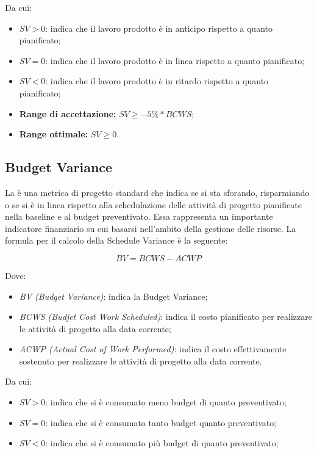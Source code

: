 \documentclass[openany,12pt,a4paper]{report}
\begin{document}
Da cui:

\begin{itemize}
    \item \textit{$SV > 0$}: indica che il lavoro prodotto è in anticipo rispetto a quanto pianificato;
    \item \textit{$SV = 0$}: indica che il lavoro prodotto è in linea rispetto a quanto pianificato;
    \item \textit{$SV < 0$}: indica che il lavoro prodotto è in ritardo rispetto a quanto pianificato;
\end{itemize}

\begin{itemize}
    \item \textbf{Range di accettazione:} $ SV \geq -5\%*BCWS $;
    
    \item \textbf{Range ottimale:} $ SV \geq 0 $.
\end{itemize}

\subsection{Budget Variance}

La  è una metrica di progetto standard che indica se si sta sforando, risparmiando o se si è in linea rispetto alla schedulazione delle attività di progetto pianificate nella baseline e al budget preventivato. Essa rappresenta un importante indicatore finanziario su cui basarsi nell'ambito della gestione delle risorse. La formula per il calcolo della Schedule Variance è la seguente:

\[ BV = BCWS - ACWP \]

Dove:

\begin{itemize}
    \item \textit{BV (Budget Variance)}: indica la Budget Variance;
    \item \textit{BCWS (Budjet Cost Work Scheduled)}: indica il costo pianificato per realizzare le attività di progetto alla data corrente;
    \item \textit{ACWP (Actual Cost of Work Performed)}: indica il costo effettivamente sostenuto per realizzare le attività di progetto alla data corrente.
\end{itemize}

Da cui:

\begin{itemize}
    \item \textit{$SV > 0$}: indica che si è consumato meno budget di quanto preventivato;
    \item \textit{$SV = 0$}: indica che si è consumato tanto budget quanto preventivato;
    \item \textit{$SV < 0$}: indica che si è consumato più budget di quanto preventivato;
\end{itemize}
\end{document}
